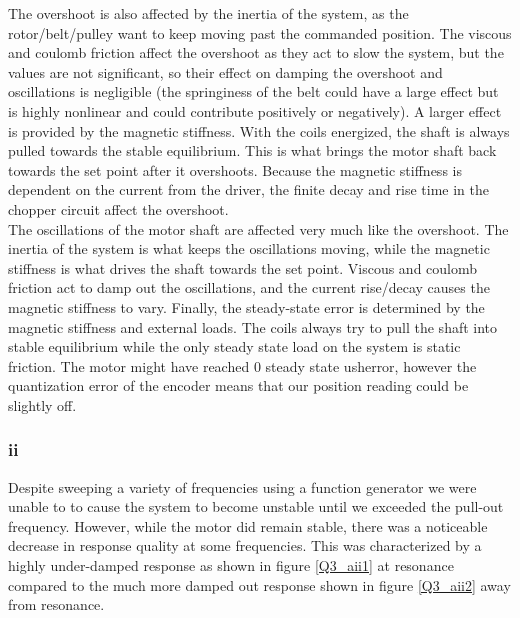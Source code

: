 \documentclass{article}
\theoremstyle{plain}
\theoremstyle{definition}
\theoremstyle{remark}
\begin{document}
The overshoot is also affected by the inertia of the system, as the rotor/belt/pulley want to keep moving past the commanded position. The viscous and coulomb friction affect the overshoot as they act to slow the system, but the values are not significant, so their effect on damping the overshoot and oscillations is negligible (the springiness of the belt could have a large effect but is highly nonlinear and could contribute positively or negatively). A larger effect is provided by the magnetic stiffness. With the coils energized, the shaft is always pulled towards the stable equilibrium. This is what brings the motor shaft back towards the set point after it overshoots. Because the magnetic stiffness is dependent on the current from the driver, the finite decay and rise time in the chopper circuit affect the overshoot.\\

The oscillations of the motor shaft are affected very much like the overshoot. The inertia of the system is what keeps the oscillations moving, while the magnetic stiffness is what drives the shaft towards the set point. Viscous and coulomb friction act to damp out the oscillations, and the current rise/decay causes the magnetic stiffness to vary. Finally, the steady-state error is determined by the magnetic stiffness and external loads. The coils always try to pull the shaft into stable equilibrium while the only steady state load on the system is static friction.  The motor might have reached 0 steady state usherror, however the quantization error of the encoder means that our position reading could be slightly off.\\


\clearpage
\subsubsection*{ii}

Despite sweeping a variety of frequencies using a function generator we were unable to to cause the system to become unstable until we exceeded the pull-out frequency.  However, while the motor did remain stable, there was a noticeable decrease in response quality at some frequencies.  This was characterized by a highly under-damped response as shown in figure \ref{Q3_aii1} at resonance compared to the much more damped out response shown in figure \ref{Q3_aii2} away from resonance.\\
\end{document}
